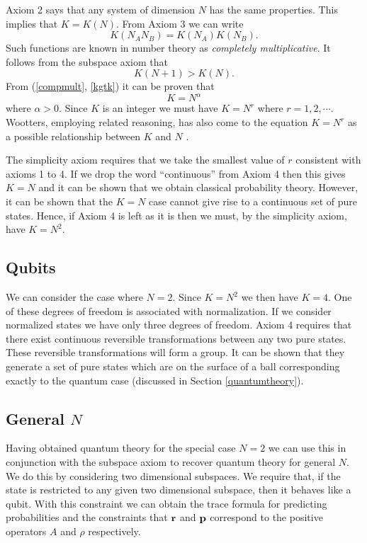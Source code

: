 \documentclass[10pt]{article}
\begin{document}
Axiom 2 says that
any system of dimension $N$ has the same properties. This implies that
$K=K(N)$.  From Axiom 3 we can write
\begin{equation}\label{compmult}
K(N_AN_B)=K(N_A)K(N_B).
\end{equation}
Such functions are known in number theory as {\it completely
multiplicative}.  It follows from the subspace axiom that
\begin{equation}\label{kgtk}
K(N+1)>K(N).
\end{equation}
From (\ref{compmult}, \ref{kgtk}) it can be proven that
\begin{equation}
K=N^{\alpha}
\end{equation}
where $\alpha>0$.  Since $K$ is an integer we must have $K=N^r$ where
$r=1,2,\cdots$. Wootters, employing related reasoning, has also
come to the equation $K=N^r$ as a possible relationship between $K$ and
$N$ \cite{wootters}.

The simplicity axiom requires that we take the smallest value of $r$
consistent with axioms 1 to 4.  If we drop the word ``continuous'' from
Axiom 4 then this gives $K=N$ and it can be shown that
we obtain classical probability
theory.  However, it can be shown that the $K=N$ case cannot give rise
to a continuous set of pure states. Hence, if Axiom 4 is left as it
is then we must, by the simplicity axiom, have $K=N^2$.

\subsection{Qubits}

We can consider the case where $N=2$.  Since $K=N^2$ we then
have $K=4$.  One of these degrees of freedom is associated with
normalization.  If we consider normalized states we have only three
degrees of freedom.  Axiom 4 requires that there exist continuous
reversible transformations between any two pure states.  These
reversible transformations will form a group. It can be shown that they
generate a set of pure states which are on the surface of a ball
corresponding exactly to the quantum case (discussed in Section
\ref{quantumtheory}).

\subsection{General $N$}

Having obtained quantum theory for the special case $N=2$ we can use
this in conjunction with the subspace axiom to recover quantum theory
for general $N$.  We do this by considering two dimensional subspaces.
We require that, if the state is restricted to any given two dimensional
subspace, then it behaves like a qubit.   With this constraint we can
obtain the trace formula for predicting probabilities and the
constraints that ${\bf r}$ and ${\bf p}$ correspond to the positive
operators $A$ and $\rho$ respectively.
\end{document}
